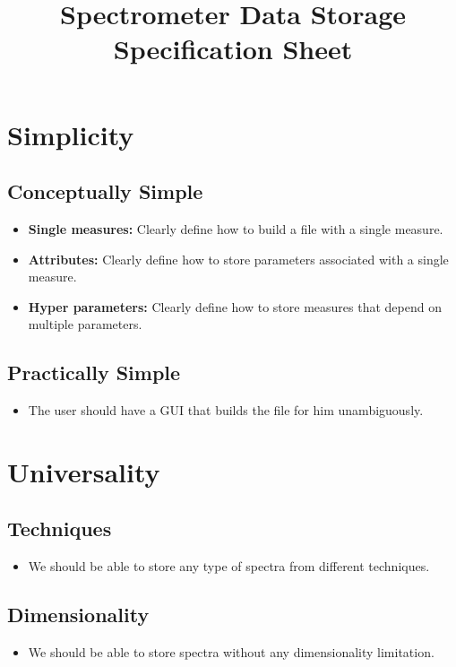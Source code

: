 \documentclass{article}
\title{Spectrometer Data Storage Specification Sheet}
\author{}
\date{}
\begin{document}
\maketitle

\section{Simplicity}
\subsection{Conceptually Simple}
\begin{itemize}
    \item \textbf{Single measures:} Clearly define how to build a file with a single measure.
    \item \textbf{Attributes:} Clearly define how to store parameters associated with a single measure.
    \item \textbf{Hyper parameters:} Clearly define how to store measures that depend on multiple parameters.
\end{itemize}

\subsection{Practically Simple}
\begin{itemize}
    \item The user should have a GUI that builds the file for him unambiguously.
\end{itemize}

\section{Universality}
\subsection{Techniques}
\begin{itemize}
    \item We should be able to store any type of spectra from different techniques.
\end{itemize}

\subsection{Dimensionality}
\begin{itemize}
    \item We should be able to store spectra without any dimensionality limitation.
\end{itemize}
\end{document}

